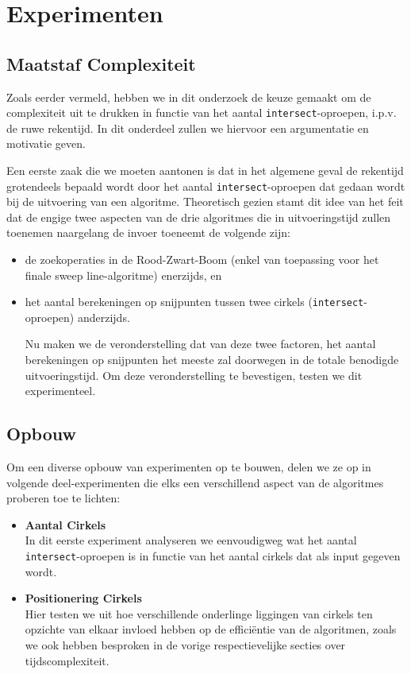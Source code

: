 \documentclass[12pt]{article}
\begin{document}
\section{Experimenten}
\subsection{Maatstaf Complexiteit}
Zoals eerder vermeld, hebben we in dit onderzoek de keuze gemaakt om de complexiteit uit te drukken in functie van het aantal \texttt{intersect}-oproepen, i.p.v. de ruwe rekentijd. In dit onderdeel zullen we hiervoor een argumentatie en motivatie geven.

Een eerste zaak die we moeten aantonen is dat in het algemene geval de rekentijd grotendeels bepaald wordt door het aantal \texttt{intersect}-oproepen dat gedaan wordt bij de uitvoering van een algoritme. Theoretisch gezien stamt dit idee van het feit dat de engige twee aspecten van de drie algoritmes die in uitvoeringstijd zullen toenemen naargelang de invoer toeneemt de volgende zijn:
\begin{itemize}
\item  de zoekoperaties in de Rood-Zwart-Boom (enkel van toepassing voor het finale sweep line-algoritme) enerzijds, en
\item  het aantal berekeningen op snijpunten tussen twee cirkels (\texttt{intersect}-oproepen) anderzijds.

Nu maken we de veronderstelling dat van deze twee factoren, het aantal berekeningen op snijpunten het meeste zal doorwegen in de totale benodigde uitvoeringstijd. Om deze veronderstelling te bevestigen, testen we dit experimenteel.
\end{itemize}

\subsection{Opbouw}
Om een diverse opbouw van experimenten op te bouwen, delen we ze op in volgende deel-experimenten die elks een verschillend aspect van de algoritmes proberen toe te lichten:
\begin{itemize}
	\item \textbf{Aantal Cirkels}\\
		In dit eerste experiment analyseren we eenvoudigweg wat het aantal \texttt{intersect}-oproepen is in functie van het aantal cirkels dat als input gegeven wordt. 
	\item \textbf{Positionering Cirkels}\\
		Hier testen we uit hoe verschillende onderlinge liggingen van cirkels ten opzichte van elkaar invloed hebben op de efficiëntie van de algoritmen, zoals we ook hebben besproken in de vorige respectievelijke secties over tijdscomplexiteit.
\end{itemize}
\end{document}
